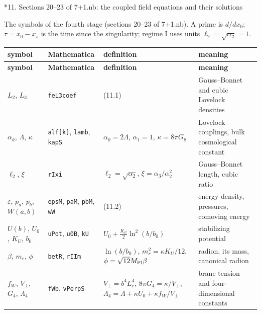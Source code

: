 \documentclass[10pt,a4paper]{article}
\makeatletter
\renewcommand\section{\@startsection{section}{1}{\z@}{-3.5ex \@plus -1ex \@minus -.2ex}{2.3ex \@plus.2ex}{\normalfont\Large\bfseries\raggedright}}
\makeatother
\begin{document}
\section*{11. Sections 20–23 of 7+1.nb: the coupled field equations and their solutions}
The symbols of the fourth stage (sections 20–23 of 7+1.nb). A prime is $d/dx_0$; $\tau=x_0-x_s$ is the time since the singularity; regime I uses units $\ell_2=\sqrt{\alpha_2}=1$.

{\footnotesize
\begin{longtable}{>{\raggedright\arraybackslash}p{}>{\raggedright\arraybackslash}p{}>{\raggedright\arraybackslash}p{}>{\raggedright\arraybackslash}p{}}
\toprule
\textbf{symbol} & \textbf{Mathematica} & \textbf{definition} & \textbf{meaning} \\
\midrule\endfirsthead
\toprule
\textbf{symbol} & \textbf{Mathematica} & \textbf{definition} & \textbf{meaning} \\
\midrule\endhead
\endfoot
\bottomrule\endlastfoot
$L_2$, $L_3$ & \texttt{feL3coef} & (11.1) & Gauss–Bonnet and cubic Lovelock densities \\
$\alpha_k$, $\Lambda$, $\kappa$ & \texttt{alf[k]}, \texttt{lamb}, \texttt{kapS} & $\alpha_0=2\Lambda$, $\alpha_1=1$, $\kappa=8\pi G_8$ & Lovelock couplings, bulk cosmological constant \\
$\ell_2$, $\xi$ & \texttt{rIxi} & $\ell_2=\sqrt{\alpha_2}$, $\xi=\alpha_3/\alpha_2^2$ & Gauss–Bonnet length, cubic ratio \\
$\varepsilon$, $p_a$, $p_b$, $W(a,b)$ & \texttt{epsM}, \texttt{paM}, \texttt{pbM}, \texttt{wW} & (11.2) & energy density, pressures, comoving energy \\
$U(b)$, $U_0$, $K_U$, $b_0$ & \texttt{uPot}, \texttt{u0B}, \texttt{kU} & $U_0+\frac{K_U}2\ln^2(b/b_0)$ & stabilizing potential \\
$\beta$, $m_r$, $\phi$ & \texttt{betR}, \texttt{rIIm} & $\ln(b/b_0)$, $m_r^2=\kappa K_U/12$, $\phi=\sqrt{12}M_{\rm Pl}\beta$ & radion, its mass, canonical radion \\
$f_W$, $V_\perp$, $G_4$, $\Lambda_4$ & \texttt{fWb}, \texttt{vPerpS} & $V_\perp=b^4L_c^4$, $8\pi G_4=\kappa/V_\perp$, $\Lambda_4=\Lambda+\kappa U_0+\kappa f_W/V_\perp$ & brane tension and four-dimensional constants \\

\end{longtable}}
\end{document}
